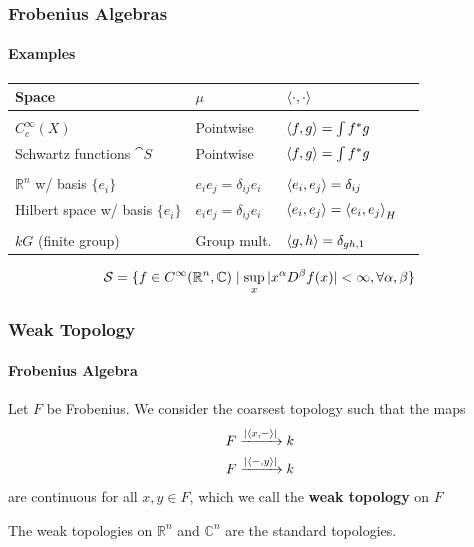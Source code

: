 \documentclass{beamer}
\begin{document}
\begin{frame}
\frametitle{Frobenius Algebras}

\framesubtitle{Examples}



\begin{tabularx}{\textwidth}{lll>{\raggedright\arraybackslash}X}
\toprule
Space & $\mu$ & $\left\langle \cdot, \cdot \right\rangle$ 
\\
\midrule
\\
$C_c^{\infty}(X)$ & Pointwise & $\left\langle f,g \right\rangle = \int f^* g$ \\
Schwartz functions $\cat{S}$ & Pointwise & $\left\langle f,g \right\rangle = \int f^* g$
\\
\\
$\mathbb{R}^n$ w/ basis $\{ e_i \}$ & $e_i e_j = \delta_{ij} e_i$ & $\left\langle e_i,e_j \right\rangle = \delta_{ij}$ \\
Hilbert space w/ basis $\{ e_i \}$ & $e_i e_j = \delta_{ij} e_i$ & $\left\langle e_i,e_j \right\rangle = \left\langle e_i, e_j \right\rangle_H$  \\
\\
$kG$ (finite group) & Group mult. & $\left\langle g,h \right\rangle = \delta_{gh, 1}$ 
\\
\bottomrule
\end{tabularx}

\medskip


\begin{equation*}
\mathcal{S} = \{ f \in C^{\infty}(\mathbb{R}^n, \mathbb{C}) \mid \sup_{x} | x^\alpha D^\beta f(x) | < \infty, \forall \alpha, \beta \}
\end{equation*}



\end{frame}




\begin{frame}

\frametitle{Weak Topology}

\framesubtitle{Frobenius Algebra}

Let $F$ be Frobenius. We consider the coarsest topology such that the maps
\begin{equation*}
\begin{split}
F \xrightarrow{| \left\langle x, - \right\rangle  |} k \\
F \xrightarrow{|  \left\langle -, y \right\rangle | } k
\end{split}
\end{equation*}
are continuous for all $x,y \in F$, which we call the \textbf{weak topology} on $F$

\medskip

 The weak topologies on $\mathbb{R}^n$ and $\mathbb{C}^n$ are the standard topologies.

\end{frame}
\end{document}
